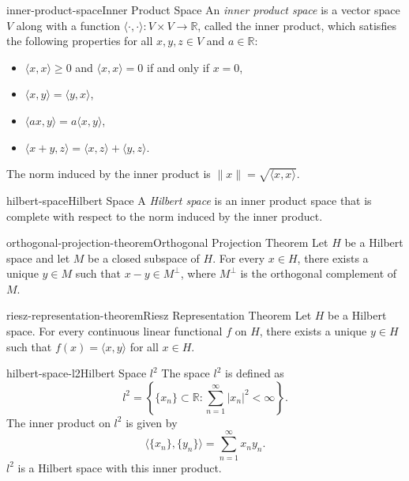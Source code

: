 \documentclass[preview]{standalone}
\begin{document}
\begin{snippetdefinition}{inner-product-space}{Inner Product Space}
    An \textit{inner product space} is a vector space \(V\) along with a function \(\langle \cdot, \cdot \rangle: V \times V \to \mathbb{R}\), called the inner product, which satisfies the following properties for all \(x, y, z \in V\) and \(a \in \mathbb{R}\):
    \begin{itemize}
        \item \(\langle x, x \rangle \geq 0\) and \(\langle x, x \rangle = 0\) if and only if \(x = 0\),
        \item \(\langle x, y \rangle = \langle y, x \rangle\),
        \item \(\langle ax, y \rangle = a \langle x, y \rangle\),
        \item \(\langle x + y, z \rangle = \langle x, z \rangle + \langle y, z \rangle\).
    \end{itemize}
    The norm induced by the inner product is \(\|x\| = \sqrt{\langle x, x \rangle}\).
\end{snippetdefinition}

\begin{snippetdefinition}{hilbert-space}{Hilbert Space}
    A \textit{Hilbert space} is an inner product space that is complete with respect to the norm induced by the inner product.
\end{snippetdefinition}

\begin{snippettheorem}{orthogonal-projection-theorem}{Orthogonal Projection Theorem}
    Let \(H\) be a Hilbert space and let \(M\) be a closed subspace of \(H\). For every \(x \in H\), there exists a unique \(y \in M\) such that \(x - y \in M^\perp\), where \(M^\perp\) is the orthogonal complement of \(M\).
\end{snippettheorem}

\begin{snippettheorem}{riesz-representation-theorem}{Riesz Representation Theorem}
    Let \(H\) be a Hilbert space. For every continuous linear functional \(f\) on \(H\), there exists a unique \(y \in H\) such that \(f(x) = \langle x, y \rangle\) for all \(x \in H\).
\end{snippettheorem}

\begin{snippetexample}{hilbert-space-l2}{Hilbert Space \(l^2\)}
    The space \(l^2\) is defined as
    \[
        l^2 = \left\{ \{x_n\} \subset \mathbb{R} : \sum_{n=1}^{\infty} |x_n|^2 < \infty \right\}.
    \]
    The inner product on \(l^2\) is given by
    \[
        \langle \{x_n\}, \{y_n\} \rangle = \sum_{n=1}^{\infty} x_n y_n.
    \]
    \(l^2\) is a Hilbert space with this inner product.
\end{snippetexample}
\end{document}
